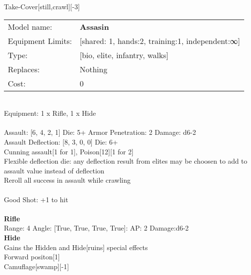 \noindent Take-Cover[still,crawl][-3]\\ 


\noindent
\begin{tabular}{ll}
Model name: &{\bf Assasin } \\
Equipment Limits: &[shared: 1, hands:2, training:1, independent:∞] \\
Type: &[bio, elite, infantry, walks] \\
Replaces: &Nothing \\
Cost: & 0\\
\end{tabular}
\ \\
Equipment: 1 x Rifle, 1 x Hide \\
\ \\
Assault: [6, 4, 2, 1] Die: 5+ Armor Penetration: 2 Damage: d6-2 \\
Assault Deflection: [8, 3, 0, 0] Die: 6+\\
\indent Cunning assault[1 for 1], Poison[12][1 for 2]\\ 
Flexible deflection die: any deflection result from elites may be choosen to add to assault value instead of deflection\\ 
Reroll all success in assault while crawling\\ 
 
\ \\
Good Shot: +1 to hit\\ 

\ \\
{\bf Rifle } \\



Range: 4  Angle: [True, True, True, True]: AP: 2 Damage:d6-2 \\




{\bf Hide } \\

Gains the Hidden and Hide[ruins] special effects\\ 
Forward positon[1]\\ 
Camuflage[swamp][-1]\\ 





 
\ \\



